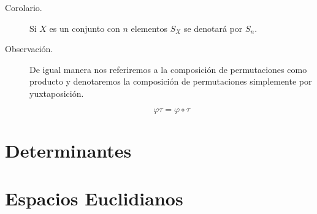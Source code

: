 \documentclass[12pt]{article}
\begin{document}
\begin{description}
\item [Corolario.] Si $X$ es un conjunto con $n$ elementos $S_X$ se denotará por $S_n$.

\item [Observación.] De igual manera nos referiremos a la composición de permutaciones como producto y denotaremos la composición de permutaciones simplemente por yuxtaposición.

\begin{equation}
\varphi \tau = \varphi \circ \tau
\end{equation}

\end{description}

\newpage
\section{Determinantes}

\newpage
\section{Espacios Euclidianos}
\end{document}
